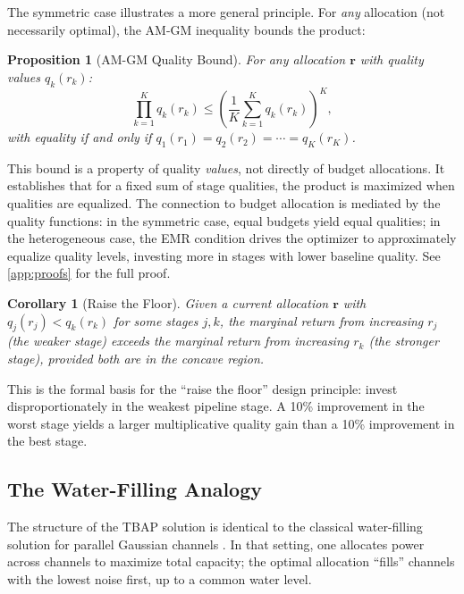 \documentclass[11pt, a4paper, logo, copyright]{googledeepmind}
\newtheorem{proposition}{Proposition}[section]
\newtheorem{corollary}{Corollary}[section]
\begin{document}
The symmetric case illustrates a more general principle. For \emph{any} allocation (not necessarily optimal), the AM-GM inequality bounds the product:

\begin{proposition}[AM-GM Quality Bound]\label{prop:amgm}
For any allocation $\mathbf{r}$ with quality values $q_k(r_k)$:
\begin{equation}\label{eq:weakest-link}
    \prod_{k=1}^K q_k(r_k) \leq \left(\frac{1}{K} \sum_{k=1}^K q_k(r_k)\right)^K,
\end{equation}
with equality if and only if $q_1(r_1) = q_2(r_2) = \cdots = q_K(r_K)$.
\end{proposition}

This bound is a property of quality \emph{values}, not directly of budget allocations. It establishes that for a fixed sum of stage qualities, the product is maximized when qualities are equalized. The connection to budget allocation is mediated by the quality functions: in the symmetric case, equal budgets yield equal qualities; in the heterogeneous case, the EMR condition drives the optimizer to approximately equalize quality levels, investing more in stages with lower baseline quality. See \cref{app:proofs} for the full proof.

\begin{corollary}[Raise the Floor]\label{cor:raise-floor}
Given a current allocation $\mathbf{r}$ with $q_j(r_j) < q_k(r_k)$ for some stages $j, k$, the marginal return from increasing $r_j$ (the weaker stage) exceeds the marginal return from increasing $r_k$ (the stronger stage), provided both are in the concave region.
\end{corollary}

This is the formal basis for the ``raise the floor'' design principle: invest disproportionately in the weakest pipeline stage. A 10\% improvement in the worst stage yields a larger multiplicative quality gain than a 10\% improvement in the best stage.

\subsection{The Water-Filling Analogy}

The structure of the TBAP solution is identical to the classical water-filling solution for parallel Gaussian channels \citep{cover2006}. In that setting, one allocates power across channels to maximize total capacity; the optimal allocation ``fills'' channels with the lowest noise first, up to a common water level.
\end{document}
